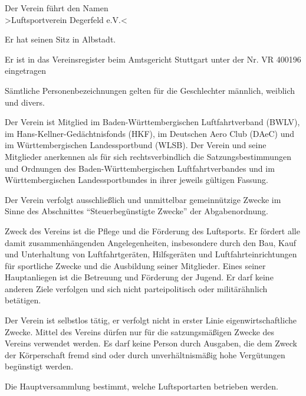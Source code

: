 \documentclass[10pt,a4paper,parskip=half]{scrartcl}
\begin{document}
\begin{contract}
  \begin{multicols}{2}
    
    Der Verein führt den Namen\\
    >Luftsportverein Degerfeld e.V.<
    
    Er hat seinen Sitz in Albstadt.
    
    Er ist in das Vereinsregister beim Amtsgericht Stuttgart unter der Nr. VR 400196 eingetragen

    Sämtliche Personenbezeichnungen gelten für die Geschlechter männlich, weiblich und divers.
    
    Der Verein ist Mitglied im Ba\-den-Würt\-tem\-ber\-gischen Luftfahrt\-verband (BWLV),
    im Hans-Kellner-Gedächtnis\-fonds (HKF),
    im Deutschen Aero Club (DAeC) und im Würt\-tem\-ber\-gischen Landessportbund (WLSB).
    Der Verein und seine Mitglieder anerkennen als für sich rechtsverbindlich die Satzungsbestimmungen und Ordnungen des Baden-Württembergischen Luftfahrt\-verbandes und im Würt\-tem\-ber\-gischen Landes\-sport\-bundes in ihrer jeweils gültigen Fassung.
    
    Der Verein verfolgt ausschließlich und unmittelbar gemeinnützige Zwecke im Sinne des Abschnittes "`Steuerbegünstigte Zwecke"' der Abgabenordnung.
    
    Zweck des Vereins ist die Pflege und die Förderung des Luftsports.
    Er fördert alle damit zusammenhängenden Angelegenheiten,
    insbesondere durch den Bau,
    Kauf und Unterhaltung von Luftfahrtgeräten,
    Hilfsgeräten und Luftfahrteinrichtungen für sportliche Zwecke und die Ausbildung seiner Mitglieder.
    Eines seiner Hauptanliegen ist die Betreuung und Förderung der Jugend.
    Er darf keine anderen Ziele verfolgen und sich nicht parteipolitisch oder militärähnlich betätigen.
    
    Der Verein ist selbstlos tätig,
    er verfolgt nicht in erster Linie eigenwirtschaftliche Zwecke.
    Mittel des Vereins dürfen nur für die satzungsmäßigen Zwecke des Vereins verwendet werden.
    Es darf keine Person durch Ausgaben,
    die dem Zweck der Körperschaft fremd sind oder durch unverhältnismäßig hohe Vergütungen begünstigt werden.
    
    Die Hauptversammlung bestimmt,
    welche Luftsportarten betrieben werden.
    

\end{multicols}
\end{contract}
\end{document}

